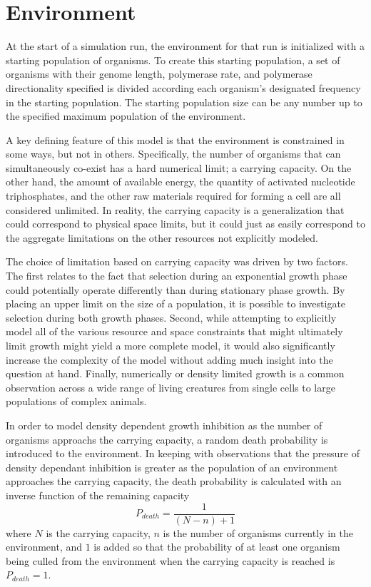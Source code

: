 \section*{Environment} %
\label{sec:environment}
At the start of a simulation run, the environment for that run is initialized with a starting population of organisms. To create this starting population, a set of organisms with their genome length, polymerase rate, and polymerase directionality specified is divided according each organism's designated frequency in the starting population. The starting population size can be any number up to the specified maximum population of the environment.

A key defining feature of this model is that the environment is constrained in some ways, but not in others. Specifically, the number of organisms that can simultaneously co-exist has a hard numerical limit; a carrying capacity. On the other hand, the amount of available energy, the quantity of activated nucleotide triphosphates, and the other raw materials required for forming a cell are all considered unlimited. In reality, the carrying capacity is a generalization that could correspond to physical space limits, but it could just as easily correspond to the aggregate limitations on the other resources not explicitly modeled.

The choice of limitation based on carrying capacity was driven by two factors. The first relates to the fact that selection during an exponential growth phase could potentially operate differently than during stationary phase growth. By placing an upper limit on the size of a population, it is possible to investigate selection during both growth phases. Second, while attempting to explicitly model all of the various resource and space constraints that might ultimately limit growth might yield a more complete model, it would also significantly increase the complexity of the model without adding much insight into the question at hand. Finally, numerically or density limited growth is a common observation across a wide range of living creatures from single cells to large populations of complex animals.

In order to model density dependent growth inhibition as the number of organisms approachs the carrying capacity, a random death probability is introduced to the environment. In keeping with observations that the pressure of density dependant inhibition is greater as the population of an environment approaches the carrying capacity, the death probability is calculated with an inverse function of the remaining capacity\[
	P_{death} = \frac{1}{(N-n)+1}
\]where $N$ is the carrying capacity, $n$ is the number of organisms currently in the environment, and $1$ is added so that the probability of at least one organism being culled from the environment when the carrying capacity is reached is $P_{death}=1$.

